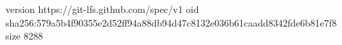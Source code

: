 version https://git-lfs.github.com/spec/v1
oid sha256:579a5b4f90355e2d52ff94a88db94d47c8132e036b61caadd8342fde6b81e7f8
size 8288
